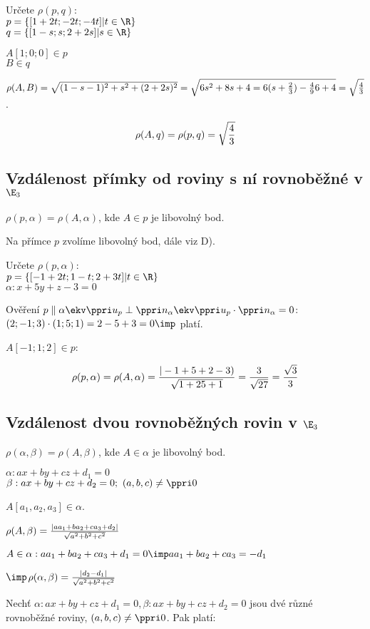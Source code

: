 \Pr Určete $\rho(p,q)$:\\
$p  =\zs{[1+2t;-2t;-4t]|t\in\R}$\\
$q  =\zs{[1-s;s;2+2s]|s\in\R}$

$A[1;0;0]\in p$\\
$B\in q$

$\rho(A,B) = \sqrt{(1-s-1)^2+s^2+(2+2s)^2} = \sqrt{6s^2+8s+4=6(s+\f23)-\f49\*6+4 }=\sqrt{ \f 43}$.

$$\rho(A,q) = \rho(p,q) = \sqrt{\frac 4 3}$$

\subsection{Vzdálenost přímky od roviny s ní rovnoběžné v $\E_3$}
\Poz
$\rho(p,\alpha) = \rho(A,\alpha)$, kde $A\in p$ je libovolný bod.

Na přímce $p$ zvolíme libovolný bod, dále viz D).

\Pr Určete $\rho(p,\alpha)$:\\
$p = \zs{[-1+2t;1-t;2+3t]|t\in\R}$\\
$\alpha : x+5y+z-3 =0$

Ověření $p\parallel \alpha \ekv \ve{u_p} \perp \ve{n_\alpha} \ekv\ve{u_p} \cdot \ve{n_\alpha}=0 $:\\
$(2;-1;3)\cdot (1;5;1) = 2 - 5 + 3 = 0 \imp$ platí.

$A[-1;1;2] \in p$:

$$ \rho(p,\alpha) = \rho(A,\alpha) = \frac{|-1+5+2-3)}{\sqrt{1+25+1}} = \frac{3}{\sqrt{27}} = \frac{\sqrt 3}3$$

\subsection{Vzdálenost dvou rovnoběžných rovin v $\E_3$}

\Poz $\rho(\alpha,\beta) = \rho(A,\beta)$, kde $A\in\alpha$ je libovolný bod.

$\alpha: ax+by+cz+d_1 = 0$\\
$\beta : ax+by+cz+d_2 = 0;\ (a,b,c) \neq \ve 0$


$A[a_1,a_2,a_3] \in \alpha$.

$\rho(A,\beta) = \frac{|aa_1+ba_2+ca_3+d_2|}{\sqrt{a^2+b^2+c^2}}$

$A\in \alpha : aa_1 + ba_2 +ca_3+d_1 = 0 \imp aa_1 + ba_2 +ca_3=-d_1 $

$\imp$\underline{$\rho(\alpha,\beta)=\frac{|d_2-d_1|}{\sqrt{a^2+b^2+c^2}}$}

\V Nechť 
$\alpha: ax+by+cz+d_1 = 0, 
\beta : ax+by+cz+d_2 = 0$
jsou dvé různé rovnoběžné roviny, $(a,b,c) \neq \ve 0$. Pak platí:

